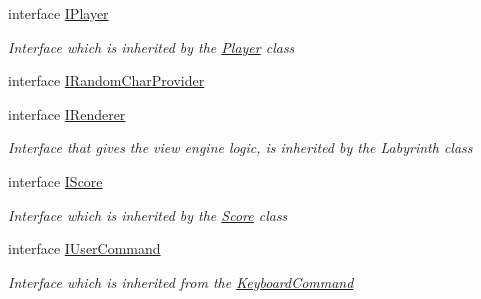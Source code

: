 \begin{DoxyCompactItemize}
interface \hyperlink{interface_labyrinth_game_1_1_interfaces_1_1_i_player}{I\+Player}
\begin{DoxyCompactList}\small\item\em Interface which is inherited by the \hyperlink{class_labyrinth_game_1_1_player}{Player} class \end{DoxyCompactList}\item 
interface \hyperlink{interface_labyrinth_game_1_1_interfaces_1_1_i_random_char_provider}{I\+Random\+Char\+Provider}
\item 
interface \hyperlink{interface_labyrinth_game_1_1_interfaces_1_1_i_renderer}{I\+Renderer}
\begin{DoxyCompactList}\small\item\em Interface that gives the view engine logic, is inherited by the Labyrinth class \end{DoxyCompactList}\item 
interface \hyperlink{interface_labyrinth_game_1_1_interfaces_1_1_i_score}{I\+Score}
\begin{DoxyCompactList}\small\item\em Interface which is inherited by the \hyperlink{class_labyrinth_game_1_1_score}{Score} class \end{DoxyCompactList}\item 
interface \hyperlink{interface_labyrinth_game_1_1_interfaces_1_1_i_user_command}{I\+User\+Command}
\begin{DoxyCompactList}\small\item\em Interface which is inherited from the \hyperlink{class_labyrinth_game_1_1_keyboard_command}{Keyboard\+Command} \end{DoxyCompactList}\end{DoxyCompactItemize}
